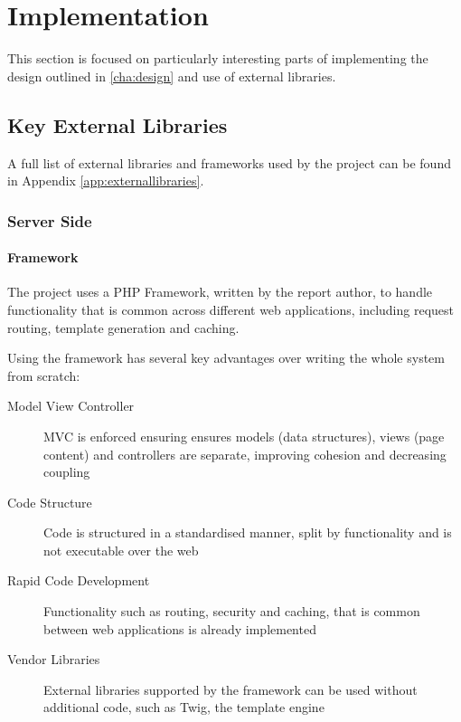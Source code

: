 \begin{comment}
Chapter 4: Implementation
The implementation details should be confined to the important, difficult or interesting aspects. Large chunks of code should be avoided, and diagrams and tables should be used to present details clearly. Other stuff...
\end{comment}

\chapter{Implementation}
\label{cha:implementation}
This section is focused on particularly interesting parts of implementing the design outlined in \autoref{cha:design} and use of external libraries.

\section[Key Libraries]{Key External Libraries}
A full list of external libraries and frameworks used by the project can be found in Appendix \autoref{app:externallibraries}.

\subsection{Server Side}
\subsubsection{Framework}
The project uses a PHP Framework, written by the report author, to handle functionality that is common across different web applications, including request routing, template generation and caching.

Using the framework has several key advantages over writing the whole system from scratch:

\begin{description}
\item[Model View Controller] MVC is enforced ensuring ensures models (data structures), views (page content) and controllers are separate, improving cohesion and decreasing coupling
\item[Code Structure] Code is structured in a standardised manner, split by functionality and is not executable over the web
\item[Rapid Code Development] Functionality such as routing, security and caching, that is common between web applications is already implemented
\item[Vendor Libraries] External libraries supported by the framework can be used without additional code, such as Twig, the template engine
\end{description}

